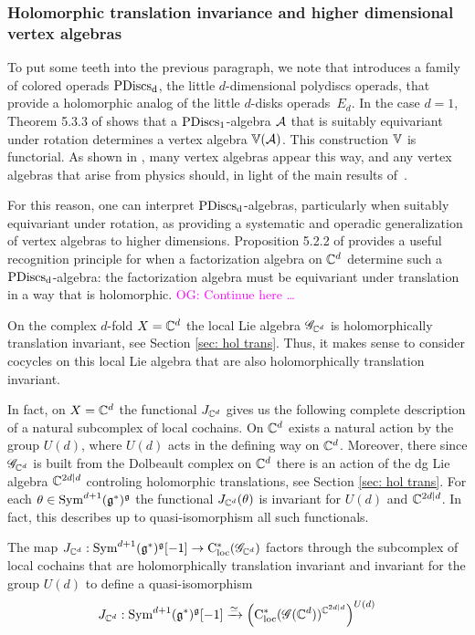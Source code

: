 \documentclass[10pt]{amsart}
\def\owen{\textcolor{magenta}{OG: }\textcolor{magenta}}
\begin{document}
\subsubsection{Holomorphic translation invariance and higher dimensional vertex algebras}

To put some teeth into the previous paragraph,
we note that \cite{CG1} introduces a family of colored operads ${\rm PDiscs_d}$, the little $d$-dimensional polydiscs operads,
that provide a holomorphic analog of the little $d$-disks operads~$E_d$.
In the case $d=1$, Theorem 5.3.3 of \cite{CG1} shows that a ${\rm PDiscs_1}$-algebra $\mathcal A$ that is suitably equivariant under rotation determines a vertex algebra $\mathbb V(\mathcal A)$.
This construction $\mathbb V$ is functorial.
As shown in \cite{CG1}, many vertex algebras appear this way, and any vertex algebras that arise from physics should, in light of the main results of~\cite{CG1,CG2}.

For this reason, one can interpret ${\rm PDiscs_d}$-algebras, particularly when suitably equivariant under rotation, as providing a systematic and operadic generalization of vertex algebras to higher dimensions. 
Proposition 5.2.2 of \cite{CG1} provides a useful recognition principle for when a factorization algebra on $\mathbb C^d$ determine such a ${\rm PDiscs_d}$-algebra: 
the factorization algebra must be equivariant under translation in a way that is holomorphic.
\owen{Continue here \dots}

On the complex $d$-fold $X = \mathbb C^d$ the local Lie algebra $\mathscr G_{\mathbb C^d}$ is holomorphically translation invariant, see Section \ref{sec: hol trans}.
Thus, it makes sense to consider cocycles on this local Lie algebra that are also holomorphically translation invariant.

In fact, on $X=\mathbb C^d$ the functional $J_{\mathbb C^d}$ gives us the following complete description of a natural subcomplex of local cochains.
On $\mathbb C^d$ exists a natural action by the group $U(d)$, where $U(d)$ acts in the defining way on $\mathbb C^d$.
Moreover, there since $\mathscr G_{\mathbb C^d}$ is built from the Dolbeault complex on $\mathbb C^d$ there is an action of the dg Lie algebra $\mathbb C^{2d|d}$ controling holomorphic translations, see Section \ref{sec: hol trans}. 
For each $\theta \in {\rm Sym}^{d+1}(\mathfrak g^*)^\mathfrak g$ the functional $J_{\mathbb C^d}(\theta)$ is invariant for $U(d)$ and $\mathbb C^{2d|d}$.
In fact, this describes up to quasi-isomorphism all such functionals.

\begin{prop}
The map $J_{\mathbb C^d} :  {\rm Sym}^{d+1}(\mathfrak g^*)^\mathfrak g [-1] \to {\rm C}_{\rm loc}^*(\mathscr G_{\mathbb C^d})$ factors through the subcomplex of local cochains that are holomorphically translation invariant and invariant for the group $U(d)$ to define a quasi-isomorphism
\[
J_{\mathbb C^d} : {\rm Sym}^{d+1}(\mathfrak g^*)^\mathfrak g [-1] \xrightarrow{\simeq} \left({\rm C}_{\rm loc}^*(\mathscr G({\mathbb C^d}))^{\mathbb C^{2d|d}}\right)^{U(d)}
\]
\end{prop}
\end{document}
